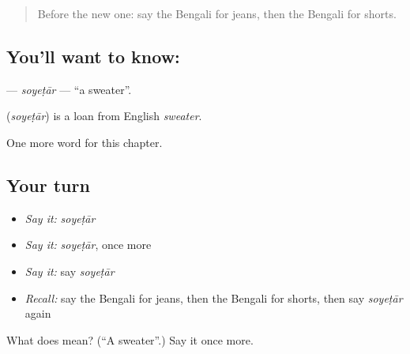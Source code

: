 \begin{quote}
Before the new one: say the Bengali for jeans, then the Bengali for shorts.
\end{quote}

\subsection*{You'll want to know: }
\textbf{} — \emph{soyeṭār} — \textquotedblleft{}a sweater\textquotedblright{}.

\begin{cousinweb}
\textbf{} (\emph{soyeṭār}) is a loan from English \emph{sweater}.
\end{cousinweb}

\begin{grammarlens}[title={What you've built}]
One more word for this chapter.
\end{grammarlens}

\subsection*{Your turn}
\begin{itemize}
\raggedright
  \item \emph{Say it:} \emph{soyeṭār}
  \item \emph{Say it:} \emph{soyeṭār}, once more
  \item \emph{Say it:} say \emph{soyeṭār}
  \item \emph{Recall:} say the Bengali for jeans, then the Bengali for shorts, then say \emph{soyeṭār} again
\end{itemize}

\begin{tcolorbox}[breakable,colback=teal!4,colframe=teal!35!black,title={Before you move on}]
What does  mean? (\textquotedblleft{}A sweater\textquotedblright{}.) Say it once more.
\end{tcolorbox}
